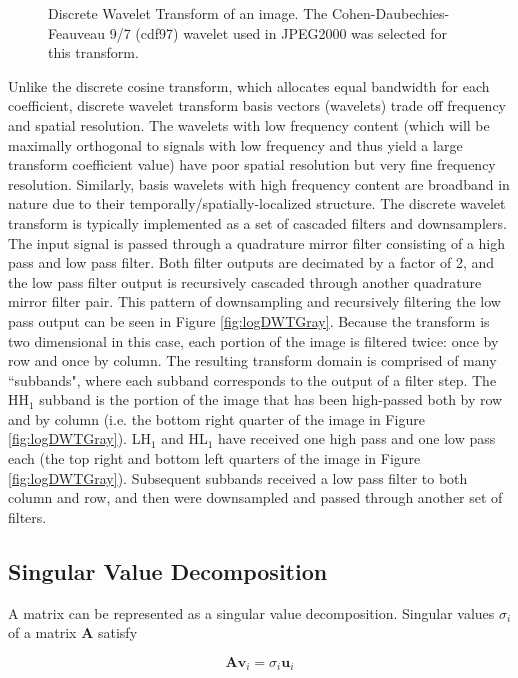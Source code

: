 \documentclass[conference]{IEEEtran}
\begin{document}
\begin{figure}[htbp]
    \caption{Discrete Wavelet Transform of an image. The Cohen-Daubechies-Feauveau 9/7 (cdf97) wavelet used in JPEG2000 was selected for this transform.}
    \label{fig:dwtImage}
\end{figure}

Unlike the discrete cosine transform, which allocates equal bandwidth for each coefficient, discrete wavelet transform basis vectors (wavelets) trade off frequency and spatial resolution.
The wavelets with low frequency content (which will be maximally orthogonal to signals with low frequency and thus yield a large transform coefficient value) have poor spatial resolution but very fine frequency resolution.
Similarly, basis wavelets with high frequency content are broadband in nature due to their temporally/spatially-localized structure.
The discrete wavelet transform is typically implemented as a set of cascaded filters and downsamplers.
The input signal is passed through a quadrature mirror filter consisting of a high pass and low pass filter.
Both filter outputs are decimated by a factor of 2, and the low pass filter output is recursively cascaded through another quadrature mirror filter pair.
This pattern of downsampling and recursively filtering the low pass output can be seen in Figure \ref{fig:logDWTGray}.
Because the transform is two dimensional in this case, each portion of the image is filtered twice: once by row and once by column.
The resulting transform domain is comprised of many ``subbands", where each subband corresponds to the output of a filter step.
The HH$_1$ subband is the portion of the image that has been high-passed both by row and by column (i.e. the bottom right quarter of the image in Figure \ref{fig:logDWTGray}).
LH$_1$ and HL$_1$ have received one high pass and one low pass each (the top right and bottom left quarters of the image in Figure \ref{fig:logDWTGray}).
Subsequent subbands received a low pass filter to both column and row, and then were downsampled and passed through another set of filters.

\subsection{Singular Value Decomposition}

A matrix can be represented as a singular value decomposition.
Singular values $\sigma_i$ of a matrix $\mathbf{A}$ satisfy

\begin{equation}
    \mathbf{A}\mathbf{v}_i = \sigma_i\mathbf{u}_i
\end{equation}
\end{document}
